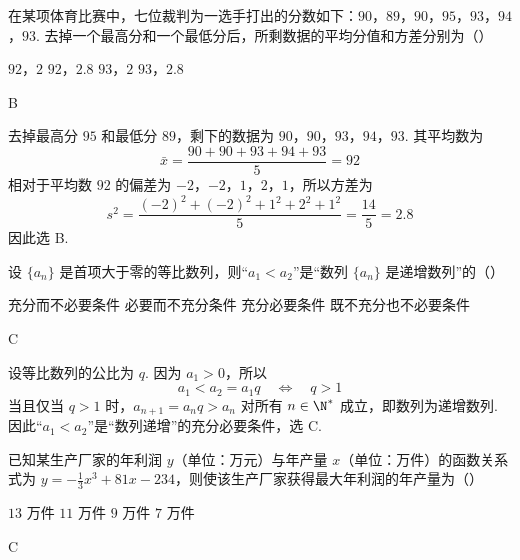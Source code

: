 \begin{problem}
在某项体育比赛中，七位裁判为一选手打出的分数如下：\(90\)，\(89\)，\(90\)，\(95\)，\(93\)，\(94\)，\(93\). 去掉一个最高分和一个最低分后，所剩数据的平均分值和方差分别为（\quad）

\choices
    {\(92\)，\(2\)}
    {\(92\)，\(2.8\)}
    {\(93\)，\(2\)}
    {\(93\)，\(2.8\)}
\end{problem}

\begin{answer}
B
\end{answer}

\begin{solution}
去掉最高分 \(95\) 和最低分 \(89\)，剩下的数据为 \(90\)，\(90\)，\(93\)，\(94\)，\(93\). 其平均数为
\[
\bar{x}=\frac{90+90+93+94+93}{5}=92
\]
相对于平均数 \(92\) 的偏差为 \(-2\)，\(-2\)，\(1\)，\(2\)，\(1\)，所以方差为
\[
s^2=\frac{(-2)^2+(-2)^2+1^2+2^2+1^2}{5}=\frac{14}{5}=2.8
\]
因此选 B.
\end{solution}

\begin{problem}
设 \(\{a_n\}\) 是首项大于零的等比数列，则“\(a_1 < a_2\)”是“数列 \(\{a_n\}\) 是递增数列”的（\quad）

\choices
    {充分而不必要条件}
    {必要而不充分条件}
    {充分必要条件}
    {既不充分也不必要条件}
\end{problem}

\begin{answer}
C
\end{answer}

\begin{solution}
设等比数列的公比为 \(q\). 因为 \(a_1>0\)，所以
\[
a_1<a_2=a_1q\quad\Longleftrightarrow\quad q>1
\]
当且仅当 \(q>1\) 时，\(a_{n+1}=a_nq>a_n\) 对所有 \(n\in\N^*\) 成立，即数列为递增数列. 因此“\(a_1<a_2\)”是“数列递增”的充分必要条件，选 C.
\end{solution}

\begin{problem}
已知某生产厂家的年利润 \(y\)（单位：万元）与年产量 \(x\)（单位：万件）的函数关系式为 \(y = -\frac{1}{3}x^{3} + 81x - 234\)，则使该生产厂家获得最大年利润的年产量为（\quad）

\choices
    {\(13\text{ 万件}\)}
    {\(11\text{ 万件}\)}
    {\(9\text{ 万件}\)}
    {\(7\text{ 万件}\)}
\end{problem}

\begin{answer}
C
\end{answer}

